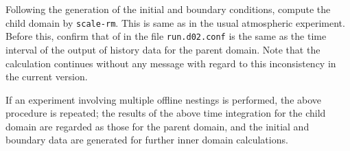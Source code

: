 Following the generation of the initial and boundary conditions, compute the child domain by \verb|scale-rm|. This is same as in the usual atmospheric experiment. Before this, confirm that   of  in the file \verb|run.d02.conf| is the same as the time interval of the output of history data for the parent domain. Note that the calculation continues without any message with regard to this inconsistency in the current version.

If an experiment involving multiple offline nestings is performed, the above procedure is repeated; the results of the above time integration for the child domain are regarded as those for the parent domain, and the initial and boundary data are generated for further inner domain calculations. 
